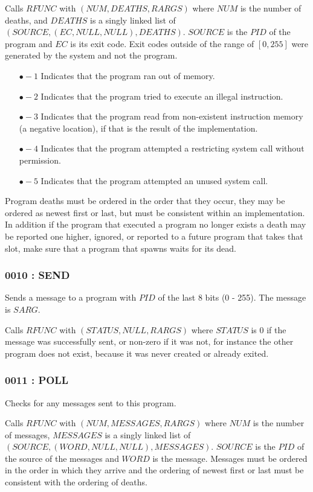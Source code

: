 \documentclass[12pt,letterpaper]{report}
\newcommand{\mem}[3]{\left(#1, #2, #3\right)}
\newcommand{\nil}{NULL}
\begin{document}
Calls $RFUNC$ with $\mem{NUM}{DEATHS}{RARGS}$ where $NUM$ is the number of deaths, and $DEATHS$ is a singly linked list of $\mem{SOURCE}{\mem{EC}{\nil}{\nil}}{DEATHS}$. $SOURCE$ is the $PID$ of the program and $EC$ is its exit code. Exit codes outside of the range of $\left[0,255\right]$ were generated by the system and not the program.
\begin{enumerate}
\item[$\bullet-1$] Indicates that the program ran out of memory.
\item[$\bullet-2$] Indicates that the program tried to execute an illegal instruction.
\item[$\bullet-3$] Indicates that the program read from non-existent instruction memory (a negative location), if that is the result of the implementation.
\item[$\bullet-4$] Indicates that the program attempted a restricting system call without permission.
\item[$\bullet-5$] Indicates that the program attempted an unused system call.
\end{enumerate}

Program deaths must be ordered in the order that they occur, they may be ordered as newest first or last, but must be consistent within an implementation. In addition if the program that executed a program no longer exists a death may be reported one higher, ignored, or reported to a future program that takes that slot, make sure that a program that spawns waits for its dead.
\subsubsection{0010 : SEND}
\label{syscall:SEND}
Sends a message to a program with $PID$ of the last 8 bits (0 - 255). The message is $SARG$.

Calls $RFUNC$ with $\mem{STATUS}{\nil}{RARGS}$ where $STATUS$ is 0 if the message was successfully sent, or non-zero if it was not, for instance the other program does not exist, because it was never created or already exited.
\subsubsection{0011 : POLL}
\label{syscall:POLL}
Checks for any messages sent to this program.

Calls $RFUNC$ with $\mem{NUM}{MESSAGES}{RARGS}$ where $NUM$ is the number of messages, $MESSAGES$ is a singly linked list of $\mem{SOURCE}{\mem{WORD}{\nil}{\nil}}{MESSAGES}$. $SOURCE$ is the $PID$ of the source of the messages and $WORD$ is the message. Messages must be ordered in the order in which they arrive and the ordering of newest first or last must be consistent with the ordering of deaths.
\end{document}
